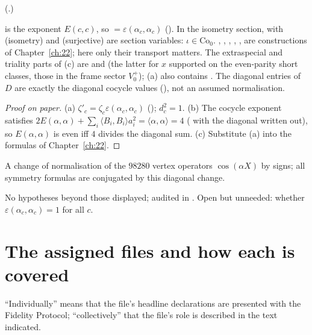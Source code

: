 (.)
\begin{dictionary}
 is the exponent $E(c,c)$, so  $=\varepsilon(\alpha_c,\alpha_c)$
().  In the isometry section,  with
 (isometry) and  (surjective) are section variables: $\iota\in\mathrm{Co}_0$.
, , , , ,
 are constructions of Chapter~\ref{ch:22}; here only their transport matters.
The extraspecial and triality parts of (c) are  and
 (the latter for $x$ supported on the even-parity short classes, those
in the frame sector $V_0^+$); (a) also contains .  The diagonal entries of $D$ are
exactly the diagonal cocycle values (), not an assumed normalisation.
\end{dictionary}
\begin{proof}[Proof on paper]
(a) $\zeta'_c=\zeta_c\varepsilon(\alpha_c,\alpha_c)$ (); $d_c^2=1$.  (b) The cocycle
exponent satisfies $2E(\alpha,\alpha)+\sum_i\langle B_i,B_i\rangle a_i^2=\langle\alpha,\alpha\rangle=4$
( with the diagonal written out), so $E(\alpha,\alpha)$ is even iff $4$ divides the
diagonal sum.  (c) Substitute (a) into the formulas of Chapter~\ref{ch:22}.
\end{proof}
\begin{physics}
A change of normalisation of the $98280$ vertex operators $\cos(\alpha X)$ by signs; all symmetry formulas
are conjugated by this diagonal change.
\end{physics}
\begin{status}
No hypotheses beyond those displayed; audited in .  Open but
unneeded: whether $\varepsilon(\alpha_c,\alpha_c)=1$ for all $c$.
\end{status}

\section{The assigned files and how each is covered}\label{ch21:sec:filemap}

``Individually'' means that the file's headline declarations are presented with the Fidelity Protocol;
``collectively'' that the file's role is described in the text indicated.

